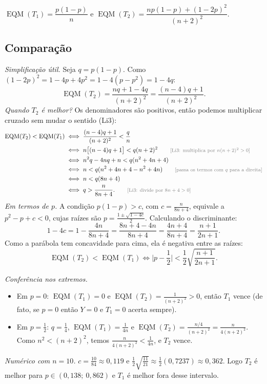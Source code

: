 \documentclass[11pt,a4paper]{article}
\newcommand{\EQM}{\operatorname{EQM}}
\newcommand{\just}[1]{\tag*{\footnotesize\textcolor{gray}{[#1]}}}
\begin{document}
\begin{resposta}
$\EQM(T_1)=\dfrac{p(1-p)}{n}$ \qquad e \qquad $\EQM(T_2)=\dfrac{np(1-p)+(1-2p)^2}{(n+2)^2}$.
\end{resposta}

\subsection*{Comparação}
\textit{Simplificação útil.} Seja $q=p(1-p)$. Como $(1-2p)^2=1-4p+4p^2=1-4(p-p^2)=1-4q$:
\[
\EQM(T_2)=\frac{nq+1-4q}{(n+2)^2}=\frac{(n-4)q+1}{(n+2)^2}.
\]
\textit{Quando $T_2$ é melhor?} Os denominadores são positivos, então podemos multiplicar cruzado sem mudar o sentido (Li3):
\begin{align*}
\EQM(T_2)<\EQM(T_1)
&\iff\frac{(n-4)q+1}{(n+2)^2}<\frac{q}{n}\\
&\iff n\big[(n-4)q+1\big]<q(n+2)^2 \just{Li3: multiplica por $n(n+2)^2>0$}\\
&\iff n^2q-4nq+n<q(n^2+4n+4)\\
&\iff n<q(n^2+4n+4-n^2+4n) \just{passa os termos com $q$ para a direita}\\
&\iff n<q(8n+4)\\
&\iff q>\frac{n}{8n+4}. \just{Li3: divide por $8n+4>0$}
\end{align*}
\textit{Em termos de $p$.} A condição $p(1-p)>c$, com $c=\frac{n}{8n+4}$, equivale a $p^2-p+c<0$, cujas raízes são $p=\frac{1\pm\sqrt{1-4c}}{2}$. Calculando o discriminante:
\[
1-4c=1-\frac{4n}{8n+4}=\frac{8n+4-4n}{8n+4}=\frac{4n+4}{8n+4}=\frac{n+1}{2n+1}.
\]
Como a parábola tem concavidade para cima, ela é negativa entre as raízes:
\[
\EQM(T_2)<\EQM(T_1)\iff\Big|p-\frac12\Big|<\frac12\sqrt{\frac{n+1}{2n+1}} .
\]

\textit{Conferência nos extremos.}
\begin{itemize}
\item Em $p=0$: $\EQM(T_1)=0$ e $\EQM(T_2)=\frac{1}{(n+2)^2}>0$, então $T_1$ vence (de fato, se $p=0$ então $Y=0$ e $T_1=0$ acerta sempre).
\item Em $p=\frac12$: $q=\frac14$, $\EQM(T_1)=\frac{1}{4n}$ e $\EQM(T_2)=\frac{n/4}{(n+2)^2}=\frac{n}{4(n+2)^2}$. Como $n^2<(n+2)^2$, temos $\frac{n}{4(n+2)^2}<\frac{1}{4n}$, e $T_2$ vence.
\end{itemize}

\textit{Numérico com $n=10$.} $c=\frac{10}{84}\approx0{,}119$ e $\frac12\sqrt{\frac{11}{21}}\approx\frac12(0{,}7237)\approx0{,}362$. Logo $T_2$ é melhor para $p\in(0{,}138;\ 0{,}862)$ e $T_1$ é melhor fora desse intervalo.
\end{document}
